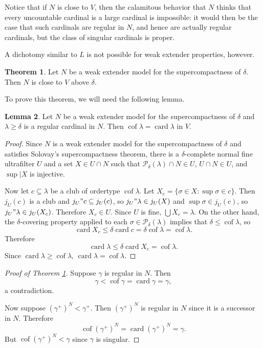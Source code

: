 \documentclass[12pt]{report}
\newcommand{\card}{\operatorname{card}}
\newcommand{\pset}{\mathcal{P}}
\DeclareMathOperator{\cof}{cof}
\theoremstyle{definition}
\newtheorem{theorem}{Theorem}[chapter]
\newtheorem{lemma}[theorem]{Lemma}
\begin{document}
Notice that if $N$ is close to $V$, then the calamitous behavior that $N$ thinks that every uncountable cardinal is a large cardinal is impossible:
it would then be the case that such cardinals are regular in $N$, and hence are actually regular cardinals, but the class of singular cardinals is proper.

A dichotomy similar to $L$ is not possible for weak extender properties, however.
\begin{theorem}
\label{WEM are close to V}
Let $N$ be a weak extender model for the supercompactness of $\delta$. Then $N$ is close to $V$ above $\delta$.
\end{theorem}
To prove this theorem, we will need the following lemma.
\begin{lemma}
Let $N$ be a weak extender model for the supercompactness of $\delta$ and $\lambda \geq \delta$ is a regular cardinal in $N$.
Then $\cof \lambda = \card \lambda$ in $V$.
\end{lemma}
\begin{proof}
Since $N$ is a weak extender model for the supercompactness of $\delta$ and satisfies Solovay's supercompactness theorem, there is a $\delta$-complete normal fine ultrafilter $U$ and a set $X \in U \cap N$ such that $\pset_\delta(\lambda) \cap N \in U$, $U \cap N \in U$, and $\sup|X$ is injective.

Now let $c \subseteq \lambda$ be a club of ordertype $\cof \lambda$. Let $X_c = \{\sigma \in X: \sup \sigma \in c\}$.
Then $j_U(c)$ is a club and $j_U"c \subseteq j_U(c)$, so $j_U"\lambda \in j_U(X)$ and $\sup \sigma \in j_U(c)$, so $j_U"\lambda \in j_U(X_c)$. Therefore $X_c \in U$.
Since $U$ is fine, $\bigcup X_c = \lambda$.
On the other hand, the $\delta$-covering property applied to each $\sigma \in \pset_\delta(\lambda)$ implies that $\delta \leq \cof \lambda$, so
$$\card X_c \leq \delta \card c = \delta \cof \lambda = \cof \lambda.$$
Therefore
$$\card \lambda \leq \delta \card X_c = \cof \lambda.$$
Since $\card \lambda \geq \cof \lambda$, $\card \lambda = \cof \lambda$.
\end{proof}
\begin{proof}[Proof of Theorem \ref{WEM are close to V}]
Suppose $\gamma$ is regular in $N$. Then
$$\gamma < \cof \gamma = \card \gamma = \gamma,$$
a contradiction.

Now suppose $(\gamma^+)^N < \gamma^+$. Then $(\gamma^+)^N$ is regular in $N$ since it is a successor in $N$. Therefore
$$\cof (\gamma^+)^N = \card (\gamma^+)^N = \gamma.$$
But $\cof(\gamma^+)^N < \gamma$ since $\gamma$ is singular.
\end{proof}
\end{document}
